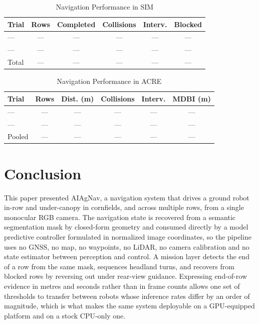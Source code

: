 \documentclass[conference]{IEEEtran}
\begin{document}
\begin{table}[t]
\caption{Navigation Performance in SIM}
\label{tab:sim}
\centering
\begin{tabular}{lccccc}
\toprule
Trial & Rows & Completed & Collisions & Interv. & Blocked \\
\midrule
--- & --- & --- & --- & --- & --- \\
--- & --- & --- & --- & --- & --- \\
\midrule
Total & --- & --- & --- & --- & --- \\
\bottomrule
\end{tabular}
\end{table}

\begin{table}[t]
\caption{Navigation Performance in ACRE}
\label{tab:acre}
\centering
\begin{tabular}{lccccc}
\toprule
Trial & Rows & Dist. (m) & Collisions & Interv. & MDBI (m) \\
\midrule
--- & --- & --- & --- & --- & --- \\
--- & --- & --- & --- & --- & --- \\
\midrule
Pooled & --- & --- & --- & --- & --- \\
\bottomrule
\end{tabular}
\end{table}

\section{Conclusion}
This paper presented AIAgNav, a navigation system that drives a ground robot
in-row and under-canopy in cornfields, and across multiple rows, from a single
monocular RGB camera. The navigation state is recovered from a semantic
segmentation mask by closed-form geometry and consumed directly by a model
predictive controller formulated in normalized image coordinates, so the
pipeline uses no GNSS, no map, no waypoints, no LiDAR, no camera calibration and
no state estimator between perception and control. A mission layer detects the
end of a row from the same mask, sequences headland turns, and recovers from
blocked rows by reversing out under rear-view guidance. Expressing end-of-row
evidence in metres and seconds rather than in frame counts allows one set of
thresholds to transfer between robots whose inference rates differ by an order
of magnitude, which is what makes the same system deployable on a GPU-equipped
platform and on a stock CPU-only one.
\end{document}
